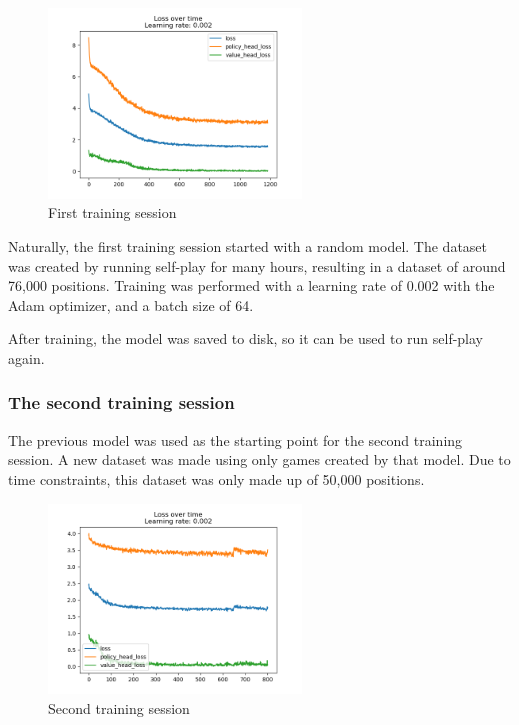 \documentclass{article}
\begin{document}
\begin{figure}[H]
    \centering
    \includegraphics[width=0.6\textwidth]{img/first-training.png}
    \caption{First training session}
\end{figure}

Naturally, the first training session started with a random model. 
The dataset was created by running self-play for many hours, resulting in a dataset of around
76,000 positions. Training was performed with a learning rate of 0.002 with the Adam optimizer, 
and a batch size of 64.

After training, the model was saved to disk, so it can be used to run self-play again.

\subsubsection{The second training session}

The previous model was used as the starting point for the second training session.
A new dataset was made using only games created by that model. 
Due to time constraints, this dataset was only made up of 50,000 positions.

\begin{figure}[H]
    \centering
    \includegraphics[width=0.6\textwidth]{img/second-training.png}
    \caption{Second training session}
\end{figure}
\end{document}
